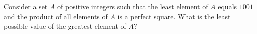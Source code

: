 Consider a set $ A$ of positive integers such that the least element of $ A$ equals $ 1001$ and the product of all elements of $ A$ is a perfect square. What is the least possible value of the greatest element of $ A$?